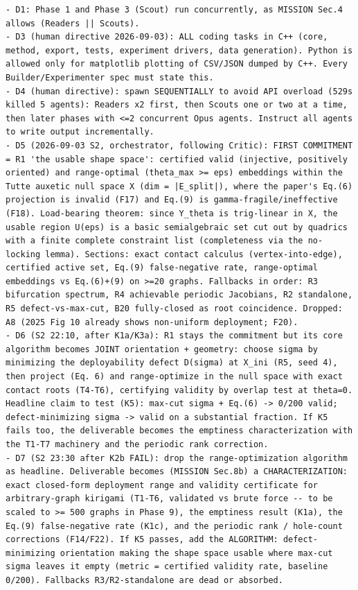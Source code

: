 \documentclass[10pt,a4paper]{article}
\begin{document}
\begin{lstlisting}
- D1: Phase 1 and Phase 3 (Scout) run concurrently, as MISSION Sec.4 allows (Readers || Scouts).
- D3 (human directive 2026-09-03): ALL coding tasks in C++ (core, method, export, tests, experiment drivers, data generation). Python is allowed only for matplotlib plotting of CSV/JSON dumped by C++. Every Builder/Experimenter spec must state this.
- D4 (human directive): spawn SEQUENTIALLY to avoid API overload (529s killed 5 agents): Readers x2 first, then Scouts one or two at a time, then later phases with <=2 concurrent Opus agents. Instruct all agents to write output incrementally.
- D5 (2026-09-03 S2, orchestrator, following Critic): FIRST COMMITMENT = R1 'the usable shape space': certified valid (injective, positively oriented) and range-optimal (theta_max >= eps) embeddings within the Tutte auxetic null space X (dim = |E_split|), where the paper's Eq.(6) projection is invalid (F17) and Eq.(9) is gamma-fragile/ineffective (F18). Load-bearing theorem: since Y_theta is trig-linear in X, the usable region U(eps) is a basic semialgebraic set cut out by quadrics with a finite complete constraint list (completeness via the no-locking lemma). Sections: exact contact calculus (vertex-into-edge), certified active set, Eq.(9) false-negative rate, range-optimal embeddings vs Eq.(6)+(9) on >=20 graphs. Fallbacks in order: R3 bifurcation spectrum, R4 achievable periodic Jacobians, R2 standalone, R5 defect-vs-max-cut, B20 fully-closed as root coincidence. Dropped: A8 (2025 Fig 10 already shows non-uniform deployment; F20).
- D6 (S2 22:10, after K1a/K3a): R1 stays the commitment but its core algorithm becomes JOINT orientation + geometry: choose sigma by minimizing the deployability defect D(sigma) at X_ini (R5, seed 4), then project (Eq. 6) and range-optimize in the null space with exact contact roots (T4-T6), certifying validity by overlap test at theta=0. Headline claim to test (K5): max-cut sigma + Eq.(6) -> 0/200 valid; defect-minimizing sigma -> valid on a substantial fraction. If K5 fails too, the deliverable becomes the emptiness characterization with the T1-T7 machinery and the periodic rank correction.
- D7 (S2 23:30 after K2b FAIL): drop the range-optimization algorithm as headline. Deliverable becomes (MISSION Sec.8b) a CHARACTERIZATION: exact closed-form deployment range and validity certificate for arbitrary-graph kirigami (T1-T6, validated vs brute force -- to be scaled to >= 500 graphs in Phase 9), the emptiness result (K1a), the Eq.(9) false-negative rate (K1c), and the periodic rank / hole-count corrections (F14/F22). If K5 passes, add the ALGORITHM: defect-minimizing orientation making the shape space usable where max-cut sigma leaves it empty (metric = certified validity rate, baseline 0/200). Fallbacks R3/R2-standalone are dead or absorbed.

\end{lstlisting}
\end{document}
